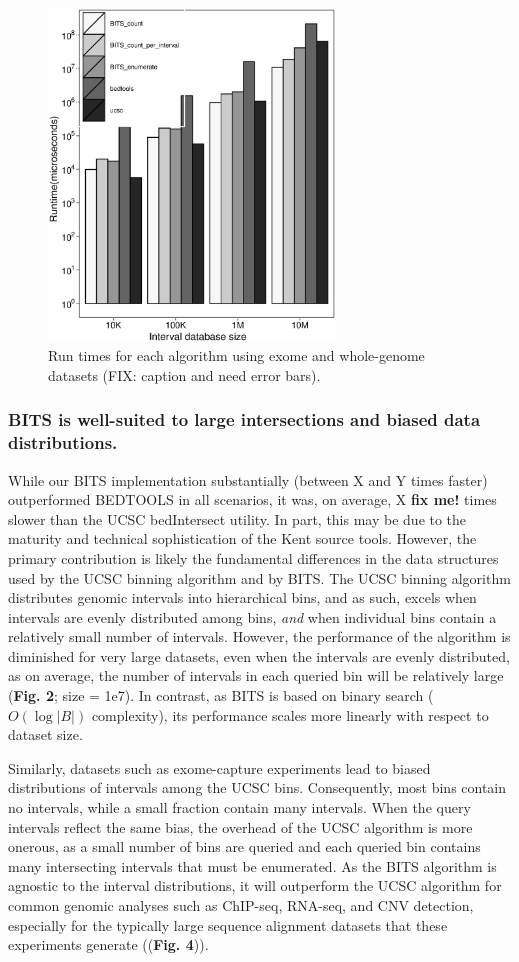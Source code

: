 \documentclass{bioinfo}
\begin{document}
	\begin{figure}[h]
		\centering
		\includegraphics[width=3in]{figures/genome-v-exome.eps}
		\caption[]{Run times for each algorithm using exome and whole-genome datasets (FIX: caption and need error bars).}
	\end{figure}
	
	\subsubsection{BITS is well-suited to large intersections and biased data distributions.}
	While our BITS implementation substantially (between X and Y times faster) outperformed BEDTOOLS 
	in all scenarios, it was, on average, X \textbf{fix me!} times slower than the UCSC bedIntersect utility. 
	In part, this may be due to the maturity and technical sophistication of the Kent source tools. However, the
	primary contribution is likely the fundamental differences in the data structures used by
	the UCSC binning algorithm and by BITS.  The UCSC binning algorithm distributes genomic intervals
	into hierarchical bins, and as such, excels when intervals are evenly distributed among bins, \emph{and}
	when individual bins contain a relatively small number of intervals.  However, the performance of the algorithm
	is diminished for very large datasets, even when the intervals are evenly distributed, as on average, the number
	of intervals in each queried bin will be relatively large (\textbf{Fig. 2}; size = 1e7). In contrast, as BITS is based on
	binary search ($O(\log |B|)$ complexity), its performance scales more linearly with respect to dataset size.

	
	Similarly, datasets such as exome-capture experiments lead to biased distributions of intervals among the UCSC bins.
	Consequently, most bins contain no intervals, while a small fraction contain many intervals. When the query intervals
	reflect the same bias, the overhead of the UCSC algorithm is more onerous, as a small number of bins are queried 
	and each queried bin contains many intersecting intervals that must be enumerated. As the BITS algorithm
	is agnostic to the interval distributions, it will outperform the UCSC algorithm for common genomic analyses such
	as ChIP-seq, RNA-seq, and CNV detection, especially for the typically large sequence alignment datasets
	that these experiments generate ((\textbf{Fig. 4})).
	
\end{document}
